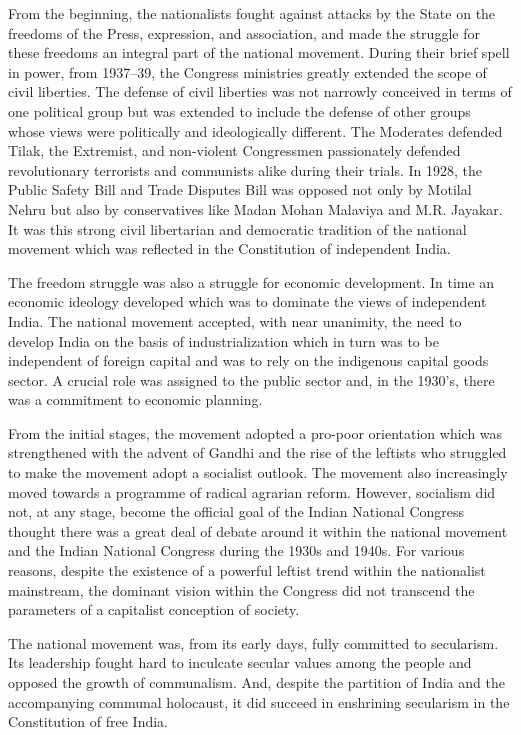 \begin{multicols}{2}
From the beginning, the nationalists fought against attacks by the State on the freedoms of the Press, expression, and association, and made the struggle for these freedoms an integral part of the national movement. During their brief spell in power, from 1937--39, the Congress ministries greatly extended the scope of civil liberties. The defense of civil liberties was not narrowly conceived in terms of one political group but was extended to include the defense of other groups whose views were politically and ideologically different. The Moderates defended Tilak, the Extremist, and non-violent Congressmen passionately defended revolutionary terrorists and communists alike during their trials. In 1928, the Public Safety Bill and Trade Disputes Bill was opposed not only by Motilal Nehru but also by conservatives like Madan Mohan Malaviya and M.R. Jayakar. It was this strong civil libertarian and democratic tradition of the national movement which was reflected in the Constitution of independent India.

The freedom struggle was also a struggle for economic development. In time an economic ideology developed which was to dominate the views of independent India. The national movement accepted, with near unanimity, the need to develop India on the basis of industrialization which in turn was to be independent of foreign capital and was to rely on the indigenous capital goods sector. A crucial role was assigned to the public sector and, in the 1930's, there was a commitment to economic planning.

From the initial stages, the movement adopted a pro-poor orientation which was strengthened with the advent of Gandhi and the rise of the leftists who struggled to make the movement adopt a socialist outlook. The movement also increasingly moved towards a programme of radical agrarian reform. However, socialism did not, at any stage, become the official goal of the Indian National Congress thought there was a great deal of debate around it within the national movement and the Indian National Congress during the 1930s and 1940s. For various reasons, despite the existence of a powerful leftist trend within the nationalist mainstream, the dominant vision within the Congress did not transcend the parameters of a capitalist conception of society.

The national movement was, from its early days, fully committed to secularism. Its leadership fought hard to inculcate secular values among the people and opposed the growth of communalism. And, despite the partition of India and the accompanying communal holocaust, it did succeed in enshrining secularism in the Constitution of free India.


\end{multicols}
